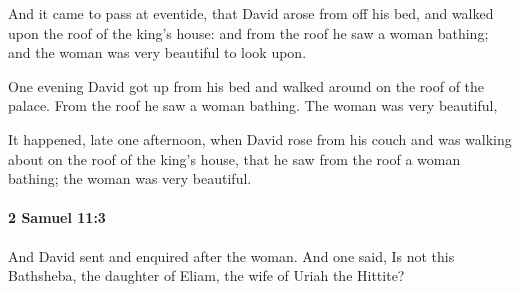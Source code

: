 			\begin{versebox}
					\item[BHS] 
					\item[ASV] And it came to pass at eventide, that David arose from off his bed, and walked upon the roof of the king's house: and from the roof he saw a woman bathing; and the woman was very beautiful to look upon.
					\item[NIV] One evening David got up from his bed and walked around on the roof of the palace. From the roof he saw a woman bathing. The woman was very beautiful,
					\item[NRSV] It happened, late one afternoon, when David rose from his couch and was walking about on the roof of the king’s house, that he saw from the roof a woman bathing; the woman was very beautiful.
			\end{versebox}

		\paragraph{2 Samuel 11:3} %
			\label{2SAMUEL-11-3}

			And David sent and enquired after the woman. And one said, Is not this Bathsheba, the daughter of Eliam, the wife of Uriah the Hittite?

